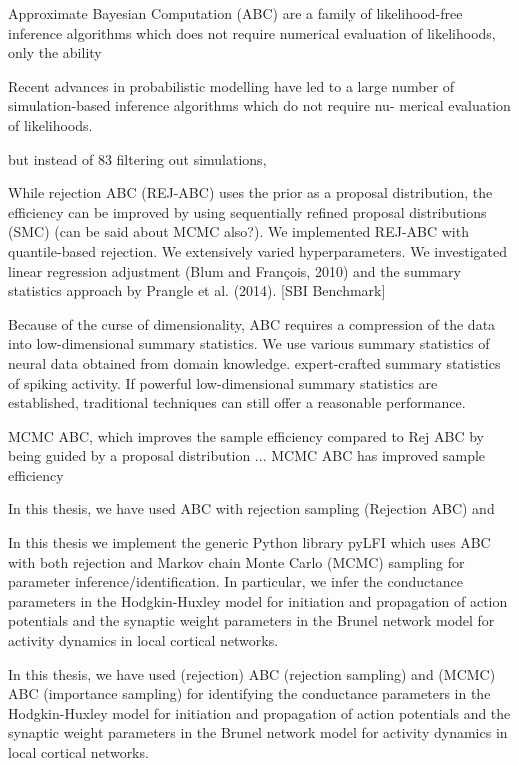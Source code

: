 Approximate Bayesian Computation (ABC) are a family of likelihood-free inference algorithms which does not require numerical evaluation of likelihoods, only the ability 

Recent advances in probabilistic modelling have led to a large number of simulation-based inference algorithms which do not require nu- merical evaluation of likelihoods. 

but instead of
83 filtering out simulations,

While rejection ABC (REJ-ABC) uses the prior as a proposal distribution, the efficiency can be improved by using sequentially refined proposal distributions (SMC) (can be said about MCMC also?). We implemented REJ-ABC with quantile-based rejection. 
We extensively varied hyperparameters. We investigated linear regression adjustment (Blum and François, 2010) and the summary statistics approach
by Prangle et al. (2014). [SBI Benchmark]



Because of the curse of dimensionality, ABC requires a compression of the data into low-dimensional summary statistics. We use various summary statistics of neural data obtained from domain knowledge.  expert-crafted summary statistics of spiking activity. If powerful low-dimensional summary statistics are established, traditional techniques can still offer a reasonable performance.

MCMC ABC, which improves the sample efficiency compared to Rej ABC by being guided by a proposal distribution ... MCMC ABC has improved sample efficiency 



In this thesis, we have used ABC with rejection sampling (Rejection ABC) and

In this thesis we implement the generic Python library pyLFI which uses ABC with both rejection and Markov chain Monte Carlo (MCMC) sampling for parameter inference/identification. In particular, we infer the conductance parameters in the Hodgkin-Huxley model for initiation and propagation of action potentials and the synaptic weight parameters in the Brunel network model for activity dynamics in local cortical networks. 

In this thesis, we have used (rejection) ABC (rejection sampling) and (MCMC) ABC (importance sampling) for identifying the conductance parameters in the Hodgkin-Huxley model for initiation and propagation of action potentials and the synaptic weight parameters in the Brunel network model for activity dynamics in local cortical networks. 

